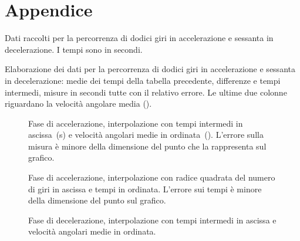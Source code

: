 \documentclass[italian,a4paper]{article}
\begin{document}
\section{Appendice}
\begin{table}[hp]\caption{Dati raccolti per la percorrenza di dodici giri in accelerazione e sessanta in decelerazione. I tempi sono in secondi.}\label{tabtempi}
\centering \small
\setlength{\tabcolsep}{4pt}
	
\end{table}
\begin{table}[hp]\caption{Elaborazione dei dati per la percorrenza di dodici giri in accelerazione e sessanta in decelerazione: medie dei tempi della tabella precedente, differenze e tempi intermedi, misure in secondi tutte con il relativo errore. Le ultime due colonne riguardano la velocità angolare media ().}\label{tabtempielab}
\centering \small
	
\end{table}
\begin{figure}[hp]\caption{Fase di accelerazione, interpolazione con tempi intermedi in ascissa~(\unit{s}) e velocità angolari medie in ordinata~(). L'errore sulla misura è minore della dimensione del punto che la rappresenta sul grafico.}\label{acc}
\centering 

\end{figure}
\begin{figure}[hp]\caption{Fase di accelerazione, interpolazione con radice quadrata del numero di giri in ascissa e tempi in ordinata. L'errore sui tempi è minore della dimensione del punto sul grafico.}\label{acc2}
\centering 

\end{figure}
\begin{figure}[hp]\caption{Fase di decelerazione, interpolazione con tempi intermedi in ascissa e velocità angolari medie in ordinata.}\label{dec}
\centering 

\end{figure}
\end{document}
